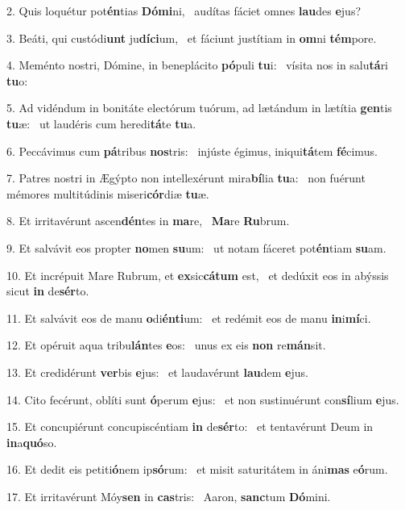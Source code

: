 2. Quis loquétur pot\textbf{én}tias \textbf{Dó}\textbf{mi}ni, \ast\  audítas fáciet omnes \textbf{lau}des \textbf{e}jus?\

3. Beáti, qui custódi\textbf{unt} ju\textbf{dí}\textbf{ci}um, \ast\  et fáciunt justítiam in \textbf{om}ni \textbf{tém}pore.\

4. Meménto nostri, Dómine, in beneplácito \textbf{pó}puli \textbf{tu}i: \ast\  vísita nos in salu\textbf{tá}ri \textbf{tu}o:\

5. Ad vidéndum in bonitáte electórum tuórum, ad lætándum in lætítia \textbf{gen}tis \textbf{tu}æ: \ast\  ut laudéris cum heredi\textbf{tá}te \textbf{tu}a.\

6. Peccávimus cum \textbf{pá}tribus \textbf{nos}tris: \ast\  injúste égimus, iniqui\textbf{tá}tem \textbf{fé}cimus.\

7. Patres nostri in Ægýpto non intellexérunt mira\textbf{bí}lia \textbf{tu}a: \ast\  non fuérunt mémores multitúdinis miseri\textbf{cór}diæ \textbf{tu}æ.\

8. Et irritavérunt ascen\textbf{dén}tes in \textbf{ma}re, \ast\  \textbf{Ma}re \textbf{Ru}brum.\

9. Et salvávit eos propter \textbf{no}men \textbf{su}um: \ast\  ut notam fáceret pot\textbf{én}tiam \textbf{su}am.\

10. Et incrépuit Mare Rubrum, et \textbf{ex}sic\textbf{cá}\textbf{tum} est, \ast\  et dedúxit eos in abýssis sicut \textbf{in} de\textbf{sér}to.\

11. Et salvávit eos de manu \textbf{o}di\textbf{én}\textbf{ti}um: \ast\  et redémit eos de manu \textbf{in}i\textbf{mí}ci.\

12. Et opéruit aqua tribu\textbf{lán}tes \textbf{e}os: \ast\  unus ex eis \textbf{non} re\textbf{mán}sit.\

13. Et credidérunt \textbf{ver}bis \textbf{e}jus: \ast\  et laudavérunt \textbf{lau}dem \textbf{e}jus.\

14. Cito fecérunt, oblíti sunt \textbf{ó}perum \textbf{e}jus: \ast\  et non sustinuérunt con\textbf{sí}lium \textbf{e}jus.\

15. Et concupiérunt concupiscéntiam \textbf{in} de\textbf{sér}to: \ast\  et tentavérunt Deum in \textbf{in}a\textbf{quó}so.\

16. Et dedit eis petiti\textbf{ó}nem ip\textbf{só}rum: \ast\  et misit saturitátem in áni\textbf{mas} e\textbf{ó}rum.\

17. Et irritavérunt Móy\textbf{sen} in \textbf{cas}tris: \ast\  Aaron, \textbf{sanc}tum \textbf{Dó}mini.\

